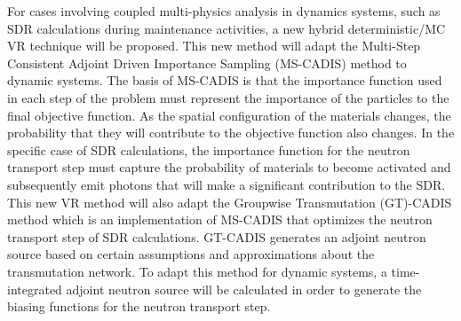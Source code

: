 For cases involving coupled multi-physics analysis in dynamics systems, such as SDR calculations
during maintenance activities,
a new hybrid deterministic/MC VR technique will be proposed.
This new method will adapt the Multi-Step Consistent Adjoint Driven Importance Sampling
(MS-CADIS) method to dynamic systems.
 The basis of MS-CADIS is that the importance function used
in each step of the problem must represent the importance of the particles to
the final objective function.  As the spatial configuration of the materials
changes, the probability that they will contribute to the objective function
also changes.
In the specific case of SDR calculations, the importance function for the neutron transport step
must capture the probability of materials to become activated and subsequently emit photons that
will make a significant contribution to the SDR.
This new VR method will also adapt 
 the Groupwise Transmutation (GT)-CADIS method 
which is an implementation of MS-CADIS
that optimizes the neutron transport step of SDR calculations.
GT-CADIS generates an adjoint
neutron source based on certain assumptions and approximations about the
transmutation network.  To adapt this method for dynamic systems, 
a time-integrated adjoint
neutron source will be calculated 
in order to generate the biasing functions for the neutron transport step.


